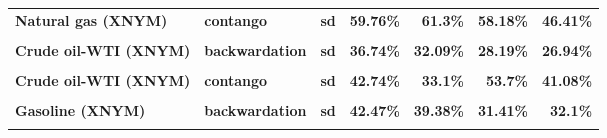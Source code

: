 \documentclass[
  authoryear,
  preprint,
  3p]{elsarticle}
\begin{document}
\begin{longtable}[t]{>{}l>{}l>{}l>{}r>{}r>{}r>{}r}
\textbf{Natural gas (XNYM)} & \textbf{contango} & \textbf{sd} & \textcolor[HTML]{4285f4}{\textbf{59.76\%}} & \textcolor[HTML]{4285f4}{\textbf{61.3\%}} & \textcolor[HTML]{4285f4}{\textbf{58.18\%}} & \textcolor[HTML]{4285f4}{\textbf{46.41\%}}\\
\textbf{\cellcolor{gray!10}{Crude oil-WTI (XNYM)}} & \textbf{\cellcolor{gray!10}{backwardation}} & \textbf{\cellcolor{gray!10}{mean}} & \textcolor[HTML]{4285f4}{\textbf{\cellcolor{gray!10}{29.17\%}}} & \textcolor[HTML]{4285f4}{\textbf{\cellcolor{gray!10}{*35.61\%}}} & \textcolor[HTML]{4285f4}{\textbf{\cellcolor{gray!10}{11.47\%}}} & \textcolor[HTML]{4285f4}{\textbf{\cellcolor{gray!10}{14.24\%}}}\\
\addlinespace
\textbf{Crude oil-WTI (XNYM)} & \textbf{backwardation} & \textbf{sd} & \textcolor[HTML]{4285f4}{\textbf{36.74\%}} & \textcolor[HTML]{4285f4}{\textbf{32.09\%}} & \textcolor[HTML]{4285f4}{\textbf{28.19\%}} & \textcolor[HTML]{4285f4}{\textbf{26.94\%}}\\
\textbf{\cellcolor{gray!10}{Crude oil-WTI (XNYM)}} & \textbf{\cellcolor{gray!10}{contango}} & \textbf{\cellcolor{gray!10}{mean}} & \textcolor[HTML]{4285f4}{\textbf{\cellcolor{gray!10}{2.21\%}}} & \textcolor[HTML]{4285f4}{\textbf{\cellcolor{gray!10}{22.04\%}}} & \textcolor[HTML]{4285f4}{\textbf{\cellcolor{gray!10}{9.95\%}}} & \textcolor[HTML]{4285f4}{\textbf{\cellcolor{gray!10}{-24.85\%}}}\\
\textbf{Crude oil-WTI (XNYM)} & \textbf{contango} & \textbf{sd} & \textcolor[HTML]{4285f4}{\textbf{42.74\%}} & \textcolor[HTML]{4285f4}{\textbf{33.1\%}} & \textcolor[HTML]{4285f4}{\textbf{53.7\%}} & \textcolor[HTML]{4285f4}{\textbf{41.08\%}}\\
\textbf{\cellcolor{gray!10}{Gasoline (XNYM)}} & \textbf{\cellcolor{gray!10}{backwardation}} & \textbf{\cellcolor{gray!10}{mean}} & \textcolor[HTML]{4285f4}{\textbf{\cellcolor{gray!10}{39\%}}} & \textcolor[HTML]{4285f4}{\textbf{\cellcolor{gray!10}{19.82\%}}} & \textcolor[HTML]{4285f4}{\textbf{\cellcolor{gray!10}{23.98\%}}} & \textcolor[HTML]{4285f4}{\textbf{\cellcolor{gray!10}{9.69\%}}}\\
\textbf{Gasoline (XNYM)} & \textbf{backwardation} & \textbf{sd} & \textcolor[HTML]{4285f4}{\textbf{42.47\%}} & \textcolor[HTML]{4285f4}{\textbf{39.38\%}} & \textcolor[HTML]{4285f4}{\textbf{31.41\%}} & \textcolor[HTML]{4285f4}{\textbf{32.1\%}}\\
\addlinespace
\textbf{\cellcolor{gray!10}{Gasoline (XNYM)}} & \textbf{\cellcolor{gray!10}{contango}} & \textbf{\cellcolor{gray!10}{mean}} & \textcolor[HTML]{4285f4}{\textbf{\cellcolor{gray!10}{-5.22\%}}} & \textcolor[HTML]{4285f4}{\textbf{\cellcolor{gray!10}{42.13\%}}} & \textcolor[HTML]{4285f4}{\textbf{\cellcolor{gray!10}{-0.09\%}}} & \textcolor[HTML]{4285f4}{\textbf{\cellcolor{gray!10}{-19.47\%}}}\\

\end{longtable}
\end{document}
